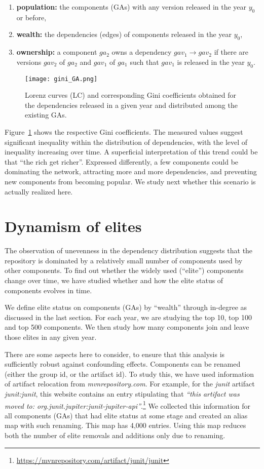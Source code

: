 \documentclass[10pt,conference]{IEEEtran}
\begin{document}
\begin{enumerate}
\item \textbf{population:} the components (GAs) with any version
released in the year $y_0$ or before,
\item \textbf{wealth:} the  dependencies (edges) of components
released in the year $y_0$,
\item \textbf{ownership:} a component $ga_2$ owns a dependency
$gav_1 \rightarrow gav_2$ if there are versions $gav_2$ of
$ga_2$ and $gav_1$ of $ga_1$ such that $gav_1$ is released in
the year $y_0$.
\end{enumerate}

\begin{figure}[t]
\centering
\texttt{[image: gini\_GA.png]}
\caption{\label{fig:gini} Lorenz curves (LC) and corresponding Gini
coefficients obtained for the dependencies released in a given
year and distributed among the existing GAs.}
\end{figure}

Figure~\ref{fig:gini} shows the respective Gini coefficients.
The measured values suggest significant inequality within the
distribution of dependencies, with the level of inequality
increasing over time. A superficial interpretation of this
trend could be that ``the rich get richer''. Expressed
differently, a few components could be dominating the network,
attracting more and more dependencies, and preventing new
components from becoming popular. We study next whether this
scenario is actually realized here. 

\section{Dynamism of elites}
\label{section:elites}

The observation of unevenness in the dependency distribution
suggests that the repository is dominated by a relatively small
number of components used by other components. To find out
whether the widely used (``elite'') components change over time,
we have studied whether and how the elite status of components
evolves in time. 

We define elite status on components (GAs) by ``wealth'' through in-degree as discussed in the last section. For each year, we are studying the top 10, top 100 and top 500 components. We then study how many components join and leave those elites in any given year.

There are some aspects here to consider, to ensure that
this analysis is sufficiently robust against confounding effects.
Components can be renamed (either the group id, or the
artifact id). To study this, we have used information of artifact
relocation from \textit{mvnrepository.com}. For example, for the
\textit{junit} artifact \textit{junit:junit}, this website contains an entry
stipulating that \textit{``this artifact was moved to: org.junit.jupiter:junit-jupiter-api''}.\footnote{\url{https://mvnrepository.com/artifact/junit/junit}}
We collected this information for all components (GAs) that had
elite status at some stage and created an alias map with such
renaming. This map has 4,000 entries. Using this map reduces
both the number of elite removals and additions only due
to renaming.
\end{document}
